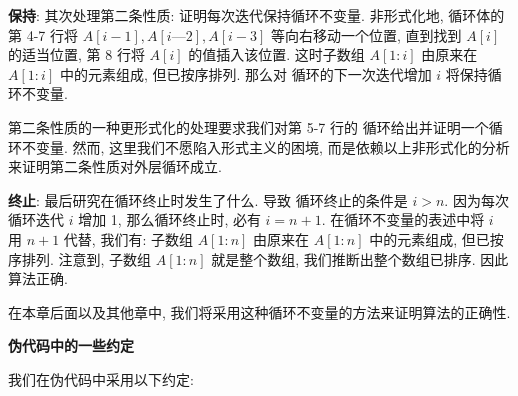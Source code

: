 \documentclass[oneside,10pt,fontset=none]{ctexbook}
\numberwithin{definition}{chapter}
\numberwithin{theorem}{chapter}
\numberwithin{proof}{chapter}
\begin{document}
\textbf{保持}: 其次处理第二条性质: 证明每次迭代保持循环不变量. 非形式化地,  循环体的第 4-7 行将 $A[i-1], A[i—2], A[i-3]$ 等向右移动一个位置, 直到找到 $A[i]$ 的适当位置, 第 8 行将 $A[i]$ 的值插入该位置. 这时子数组 $A[1:i]$ 由原来在 $A[1:i]$ 中的元素组成, 但已按序排列. 那么对  循环的下一次迭代增加 $i$ 将保持循环不变量.

第二条性质的一种更形式化的处理要求我们对第 5-7 行的  循环给出并证明一个循环不变量. 然而, 这里我们不愿陷入形式主义的困境, 而是依赖以上非形式化的分析来证明第二条性质对外层循环成立.

\textbf{终止}: 最后研究在循环终止时发生了什么. 导致  循环终止的条件是 $i > n$. 因为每次循环迭代 $i$ 增加 1, 那么循环终止时, 必有 $i=n+1$. 在循环不变量的表述中将 $i$ 用 $n+1$ 代替, 我们有: 子数组 $A[1:n]$ 由原来在 $A[1:n]$ 中的元素组成, 但已按序排列. 注意到, 子数组 $A[1:n]$ 就是整个数组, 我们推断出整个数组已排序. 因此算法正确.

在本章后面以及其他章中, 我们将采用这种循环不变量的方法来证明算法的正确性.

\textbf{伪代码中的一些约定}

我们在伪代码中采用以下约定:
\end{document}
